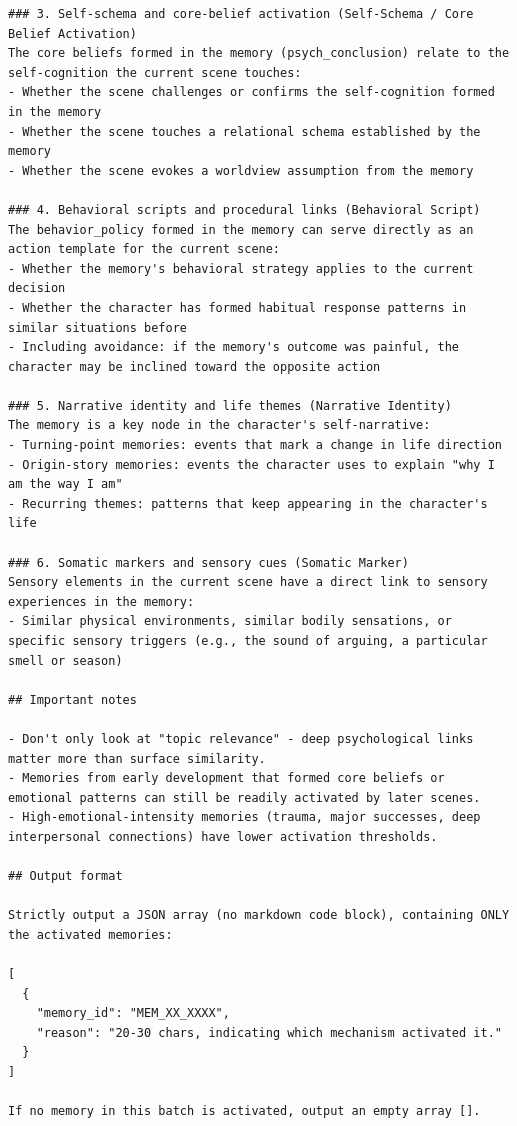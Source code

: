 \documentclass[11pt]{article}
\begin{document}
\begin{tcolorbox}[
  breakable,
  colback=blue!5,
  colframe=blue!60!black,
  title={\textbf{Stage 1 --- Memory Activation Screening Prompt}},
  fonttitle=\bfseries,
  rounded corners,
  boxrule=1.0pt
]
\begin{Verbatim}[fontsize=\scriptsize, breaklines=true, breaksymbolleft={}, breaksymbolright={}, breakindent=1em]
### 3. Self-schema and core-belief activation (Self-Schema / Core Belief Activation)
The core beliefs formed in the memory (psych_conclusion) relate to the self-cognition the current scene touches:
- Whether the scene challenges or confirms the self-cognition formed in the memory
- Whether the scene touches a relational schema established by the memory
- Whether the scene evokes a worldview assumption from the memory

### 4. Behavioral scripts and procedural links (Behavioral Script)
The behavior_policy formed in the memory can serve directly as an action template for the current scene:
- Whether the memory's behavioral strategy applies to the current decision
- Whether the character has formed habitual response patterns in similar situations before
- Including avoidance: if the memory's outcome was painful, the character may be inclined toward the opposite action

### 5. Narrative identity and life themes (Narrative Identity)
The memory is a key node in the character's self-narrative:
- Turning-point memories: events that mark a change in life direction
- Origin-story memories: events the character uses to explain "why I am the way I am"
- Recurring themes: patterns that keep appearing in the character's life

### 6. Somatic markers and sensory cues (Somatic Marker)
Sensory elements in the current scene have a direct link to sensory experiences in the memory:
- Similar physical environments, similar bodily sensations, or specific sensory triggers (e.g., the sound of arguing, a particular smell or season)

## Important notes

- Don't only look at "topic relevance" - deep psychological links matter more than surface similarity.
- Memories from early development that formed core beliefs or emotional patterns can still be readily activated by later scenes.
- High-emotional-intensity memories (trauma, major successes, deep interpersonal connections) have lower activation thresholds.

## Output format

Strictly output a JSON array (no markdown code block), containing ONLY the activated memories:

[
  {
    "memory_id": "MEM_XX_XXXX",
    "reason": "20-30 chars, indicating which mechanism activated it."
  }
]

If no memory in this batch is activated, output an empty array [].


\end{Verbatim}
\end{tcolorbox}
\end{document}
